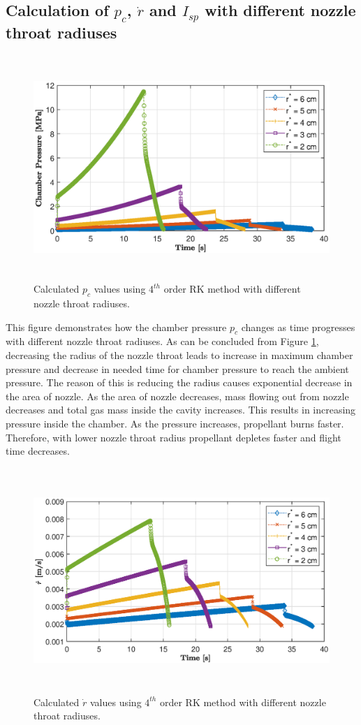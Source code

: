 \documentclass[letterpaper,12pt]{article}
\begin{document}
\subsection{Calculation of $p_c$, $\dot{r}$ and $I_{sp}$ with different nozzle throat radiuses}
\begin{figure}[!h]
	\centering
	\includegraphics[height = 8.5cm]{graphs/q2_pc.eps}
	\caption{Calculated $p_c$ values using $4^{th}$ order RK method with different nozzle throat radiuses.}
	\label{fig:q2p_cp}
\end{figure}

This figure demonstrates how the chamber pressure $p_c$ changes as time progresses with different nozzle throat radiuses.
As can be concluded from Figure \ref{fig:q2p_cp}, decreasing the radius of the nozzle throat leads to increase in maximum chamber pressure
and decrease in needed time for chamber pressure to reach the ambient pressure. 
The reason of this is reducing the radius causes exponential decrease in the area of nozzle.
As the area of nozzle decreases, mass flowing out from nozzle decreases and total gas mass inside the cavity increases. 
This results in increasing pressure inside the chamber. As the pressure increases, propellant burns faster. 
Therefore, with lower nozzle throat radius propellant depletes faster and flight time decreases.

\newpage
\begin{figure}[!h]
	\centering
	\includegraphics[height = 8.5cm]{graphs/q2_rdot.eps}
	\caption{Calculated $\dot{r}$ values using $4^{th}$ order RK method with different nozzle throat radiuses.}
	\label{fig:q2r_dot}
\end{figure}
\end{document}
